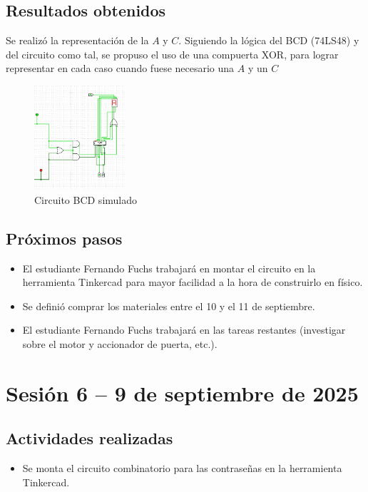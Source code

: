 \documentclass[12pt,letterpaper]{article}
\begin{document}
\subsection*{Resultados obtenidos}
Se realizó la representación de la $A$ y $C$. Siguiendo la lógica del BCD (74LS48) y del circuito como tal, se propuso el uso de una compuerta XOR, para lograr representar en cada caso cuando fuese necesario una $A$ y un $C$
\begin{figure}[H]
    \centering
    \includegraphics[width=0.3\textwidth]{images/bcd_mod.png} %
    \caption{Circuito BCD simulado}
    \label{fig:sensores}
\end{figure}

\subsection*{Próximos pasos}
\begin{itemize}
    \item El estudiante Fernando Fuchs trabajará en montar el circuito en la herramienta Tinkercad para mayor facilidad a la hora de construirlo en físico.
    \item Se definió comprar los materiales entre el 10 y el 11 de septiembre.
    \item El estudiante Fernando Fuchs trabajará en las tareas restantes (investigar sobre el motor y accionador de puerta, etc.).
\end{itemize}


\section{Sesión 6 -- 9 de septiembre de 2025}
\subsection*{Actividades realizadas}
\begin{itemize}
    \item Se monta el circuito combinatorio para las contraseñas en la herramienta Tinkercad.
\end{itemize}
\end{document}
